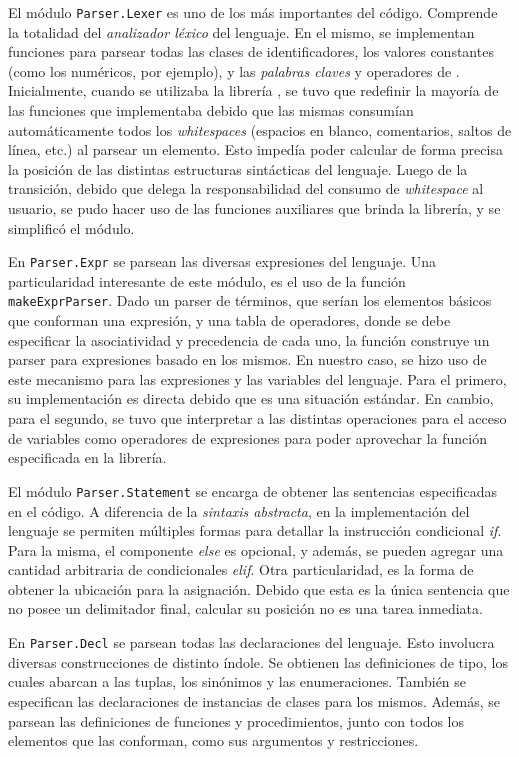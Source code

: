 El módulo \lstinline[style = module]{Parser.Lexer} es uno de los más importantes del código.
Comprende la totalidad del \textit{analizador léxico} del lenguaje.
En el mismo, se implementan funciones para parsear todas las clases de identificadores, los valores constantes (como los numéricos, por ejemplo), y las \textit{palabras claves} y operadores de \Lenguaje{}.
Inicialmente, cuando se utilizaba la librería \Parsec{}, se tuvo que redefinir la mayoría de las funciones que implementaba debido que las mismas consumían automáticamente todos los \textit{whitespaces} (espacios en blanco, comentarios, saltos de línea, etc.) al parsear un elemento.
Esto impedía poder calcular de forma precisa la posición de las distintas estructuras sintácticas del lenguaje.
Luego de la transición, debido que \Megaparsec{} delega la responsabilidad del consumo de \textit{whitespace} al usuario, se pudo hacer uso de las funciones auxiliares que brinda la librería, y se simplificó el módulo.

En \lstinline[style = module]{Parser.Expr} se parsean las diversas expresiones del lenguaje.
Una particularidad interesante de este módulo, es el uso de la función \lstinline[style = haskell]{makeExprParser}.
Dado un parser de términos, que serían los elementos básicos que conforman una expresión, y una tabla de operadores, donde se debe especificar la asociatividad y precedencia de cada uno, la función construye un parser para expresiones basado en los mismos.
En nuestro caso, se hizo uso de este mecanismo para las expresiones y las variables del lenguaje.
Para el primero, su implementación es directa debido que es una situación estándar.
En cambio, para el segundo, se tuvo que interpretar a las distintas operaciones para el acceso de variables como operadores de expresiones para poder aprovechar la función especificada en la librería.

El módulo \lstinline[style = module]{Parser.Statement} se encarga de obtener las sentencias especificadas en el código.
A diferencia de la \textit{sintaxis abstracta}, en la implementación del lenguaje se permiten múltiples formas para detallar la instrucción condicional \textit{if}.
Para la misma, el componente \textit{else} es opcional, y además, se pueden agregar una cantidad arbitraria de condicionales \textit{elif}.
Otra particularidad, es la forma de obtener la ubicación para la asignación.
Debido que esta es la única sentencia que no posee un delimitador final, calcular su posición no es una tarea inmediata.

En \lstinline[style = module]{Parser.Decl} se parsean todas las declaraciones del lenguaje.
Esto involucra diversas construcciones de distinto índole.
Se obtienen las definiciones de tipo, los cuales abarcan a las tuplas, los sinónimos y las enumeraciones.
También se especifican las declaraciones de instancias de clases para los mismos.
Además, se parsean las definiciones de funciones y procedimientos, junto con todos los elementos que las conforman, como sus argumentos y restricciones.

